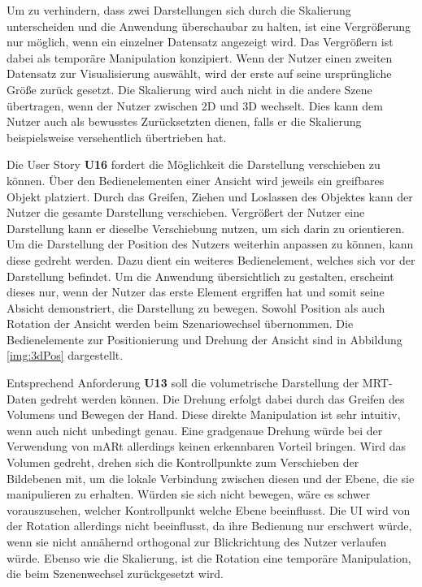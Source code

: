 Um zu verhindern, dass zwei Darstellungen sich durch die Skalierung unterscheiden und die Anwendung überschaubar zu halten, ist eine Vergrößerung nur möglich, wenn ein einzelner Datensatz angezeigt wird. 
Das Vergrößern ist dabei als temporäre Manipulation konzipiert. Wenn der Nutzer einen zweiten Datensatz zur Visualisierung auswählt, wird der erste auf seine ursprüngliche Größe zurück gesetzt. Die Skalierung wird auch nicht in die andere Szene übertragen, wenn der Nutzer zwischen 2D und 3D wechselt. Dies kann dem Nutzer auch als bewusstes Zurücksetzten dienen, falls er die Skalierung beispielsweise versehentlich übertrieben hat.

Die User Story \textbf{U16} fordert die Möglichkeit die Darstellung verschieben zu können. %
Über den Bedienelementen einer Ansicht wird jeweils ein greifbares Objekt platziert. Durch das Greifen, Ziehen und Loslassen des Objektes kann der Nutzer die gesamte Darstellung verschieben. %
Vergrößert der Nutzer eine Darstellung kann er dieselbe Verschiebung nutzen, um sich darin zu orientieren. 
Um die Darstellung der Position des Nutzers weiterhin anpassen zu können, kann diese gedreht werden. Dazu dient ein weiteres Bedienelement, welches sich vor der Darstellung befindet. Um die Anwendung übersichtlich zu gestalten, erscheint dieses nur, wenn der Nutzer das erste Element ergriffen hat und somit seine Absicht demonstriert, die Darstellung zu bewegen. 
Sowohl Position als auch Rotation der Ansicht werden beim Szenariowechsel übernommen.
Die Bedienelemente zur Positionierung und Drehung der Ansicht sind in Abbildung \ref{img:3dPos} dargestellt. 

Entsprechend Anforderung \textbf{U13} soll die volumetrische Darstellung der MRT-Daten gedreht werden können. 
Die Drehung erfolgt dabei durch das Greifen des Volumens und Bewegen der Hand. Diese direkte Manipulation ist sehr intuitiv, wenn auch nicht unbedingt genau. Eine gradgenaue Drehung würde bei der Verwendung von mARt allerdings keinen erkennbaren Vorteil bringen. 
Wird das Volumen gedreht, drehen sich die Kontrollpunkte zum Verschieben der Bildebenen mit, um die lokale Verbindung zwischen diesen und der Ebene, die sie manipulieren zu erhalten. Würden sie sich nicht bewegen, wäre es schwer vorauszusehen, welcher Kontrollpunkt welche Ebene beeinflusst. 
Die UI wird von der Rotation allerdings nicht beeinflusst, da ihre Bedienung nur erschwert würde, wenn sie nicht annähernd orthogonal zur Blickrichtung des Nutzer verlaufen würde. 
Ebenso wie die Skalierung, ist die Rotation eine temporäre Manipulation, die beim Szenenwechsel zurückgesetzt wird.


